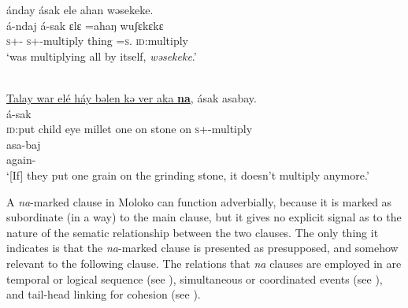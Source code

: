       \medskip
ánday  ásak  ele  ahan  wəsekeke. \\      
\gll á-ndaj á-sak   ɛlɛ      =ahaŋ  wuʃɛkɛkɛ\\
     \textsc{s}+{\IFV}-{\PRG}  \textsc{s}+{\IFV}-multiply   thing  =\textsc{s}.{\POSS}   \textsc{id}:multiply\\
\glt  ‘was multiplying all by itself, \textit{wəsekeke}.’
\z

\ea \label{ex:11:14}
\\
\underline{Talay  war  elé  háy  bəlen  kə  ver  aka  \textbf{na}},  ásak  asabay. \\
\gll  {}          á-sak  \\
      \textsc{id}:put  child  eye  millet  one  on  stone  on  {\PSP} \textsc{s}+{\IFV}-multiply  \\
      
      \medskip
\gll asa-baj\\
      again-{\NEG}\\
\glt  ‘[If] they put one grain on the grinding stone, it doesn’t multiply anymore.’
\z

 
A \textit{na}{}-marked clause in Moloko can function adverbially, because it is marked as subordinate (in a way) to the main clause, but it gives no explicit signal as to the nature of the sematic relationship between the two clauses.  The only thing it indicates is that the \textit{na}{}-marked clause is presented as presupposed, and somehow relevant to the following clause. The relations that \textit{na} clauses are employed in are temporal or logical sequence (see ), simultaneous or coordinated events (see ), and tail-head linking for cohesion (see ).

